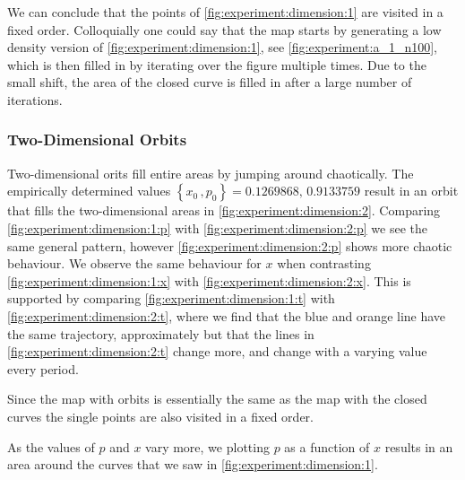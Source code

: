 We can conclude that the points of \cref{fig:experiment:dimension:1} are visited in a fixed order. Colloquially one could say that the map starts by generating a low density version of \cref{fig:experiment:dimension:1}, see \cref{fig:experiment:a_1_n100}, which is then filled in by iterating over the figure multiple times. Due to the small shift, the area of the closed curve is filled in after a large number of iterations.

\subsubsection{Two-Dimensional Orbits}	
\label{sss:experiment:a:2D}
	Two-dimensional orits fill entire areas by jumping around chaotically. The empirically determined values $\left\{x_0\,, p_0 \right\} = {\num{0.1269868},\,\num{0.9133759}}$ result in an orbit that fills the two-dimensional areas in \cref{fig:experiment:dimension:2}. Comparing \cref{fig:experiment:dimension:1:p} with \cref{fig:experiment:dimension:2:p} we see the same general pattern, however \cref{fig:experiment:dimension:2:p} shows more chaotic behaviour. We observe the same behaviour for $x$ when contrasting \cref{fig:experiment:dimension:1:x} with \cref{fig:experiment:dimension:2:x}. This is supported by comparing \cref{fig:experiment:dimension:1:t} with \cref{fig:experiment:dimension:2:t}, where we find that the blue and orange line have the same trajectory, approximately but that the lines in \cref{fig:experiment:dimension:2:t} change more, and change with a varying value every period.

	Since the map with orbits is essentially the same as the map with the closed curves the single points are also visited in a fixed order. 

	As the values of $p$ and $x$ vary more, we plotting $p$ as a function of $x$ results in an area around the curves that we saw in \cref{fig:experiment:dimension:1}.
